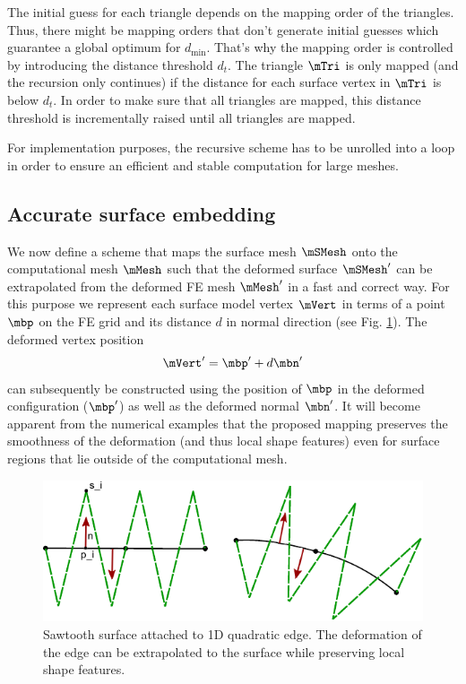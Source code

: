 The initial guess for each triangle depends on the mapping order of the triangles. Thus, there might be mapping orders that don't generate initial guesses which guarantee a global optimum for $d_{\min}$. That's why the mapping order is controlled by introducing the distance threshold $d_{t}$. The triangle $\mTri$ is only mapped (and the recursion only continues) if the distance for each surface vertex in $\mTri$ is below $d_{t}$. In order to make sure that all triangles are mapped, this distance threshold is incrementally raised until all triangles are mapped. 

For implementation purposes, the recursive scheme has to be unrolled into a loop in order to ensure an efficient and stable computation for large meshes.

\subsection{Accurate surface embedding}


We now define a scheme that maps the surface mesh $\mSMesh$ onto the computational mesh $\mMesh$ such that the deformed surface $\mSMesh'$ can be extrapolated from the deformed FE mesh $\mMesh'$ in a fast and correct way. For this purpose we represent each surface model vertex $\mVert$ in terms of a point $\mbp$ on the FE grid and its distance $d$ in normal direction (see Fig. \ref{MethodIllustration}). The deformed vertex position  
\begin{equation}
\mVert ' = \mbp ' + d \mbn '
\end{equation}
can subsequently be constructed using the position of $\mbp$ in the deformed configuration ($\mbp '$) as well as the deformed normal $\mbn '$. It will become apparent from the numerical examples that the proposed mapping preserves the smoothness of the deformation (and thus local shape features) even for surface regions that lie outside of the computational mesh.

\begin{figure}
   \centering   
\includegraphics[width=\textwidth]{Figures/Seasaw.pdf}
\caption{Sawtooth surface attached to 1D quadratic edge. The deformation of the edge can be extrapolated to the surface while preserving local shape features.}
\label{MethodIllustration}
\end{figure}

